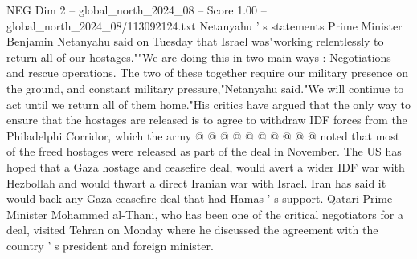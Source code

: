 \begin{textsample}{NEG Dim 2 – global\_north\_2024\_08 – Score 1.00 – global\_north\_2024\_08/113092124.txt}
Netanyahu ' s statements Prime Minister Benjamin Netanyahu said on Tuesday that Israel was"working relentlessly to return all of our hostages.""We are doing this in two main ways : Negotiations and rescue operations.
The two of these together require our military presence on the ground, and constant military pressure,"Netanyahu said."We will continue to act until we return all of them home."His critics have argued that the only way to ensure that the hostages are released is to agree to withdraw IDF forces from the Philadelphi Corridor, which the army @ @ @ @ @ @ @ @ @ @ noted that most of the freed hostages were released as part of the deal in November.
The US has hoped that a Gaza hostage and ceasefire deal, would avert a wider IDF war with Hezbollah and would thwart a direct Iranian war with Israel.
Iran has said it would back any Gaza ceasefire deal that had Hamas ' s support.
Qatari Prime Minister Mohammed al-Thani, who has been one of the critical negotiators for a deal, visited Tehran on Monday where he discussed the agreement with the country ' s president and foreign minister.

\end{textsample}
